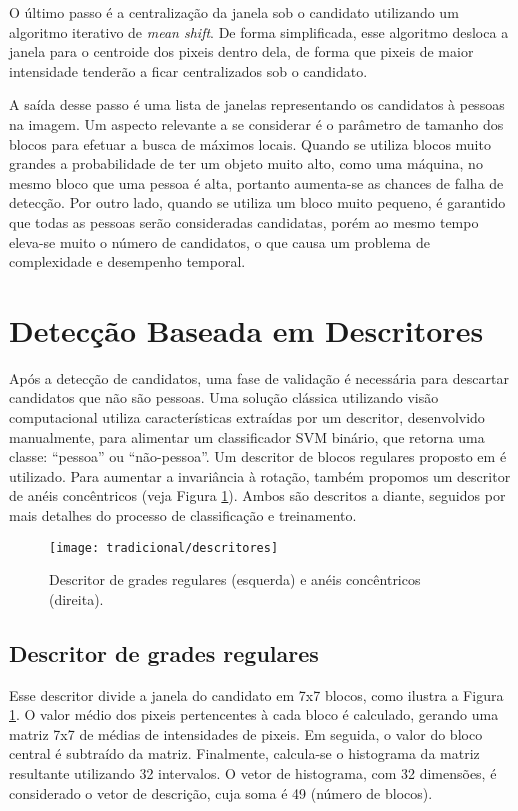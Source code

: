     O último passo é a centralização da janela sob o candidato utilizando um algoritmo iterativo de \textit{mean shift}. De forma simplificada, esse algoritmo desloca a janela para o centroide dos pixeis dentro dela, de forma que pixeis de maior intensidade tenderão a ficar centralizados sob o candidato.

    A saída desse passo é uma lista de janelas representando os candidatos à pessoas na imagem. Um aspecto relevante a se considerar é o parâmetro de tamanho dos blocos para efetuar a busca de máximos locais. Quando se utiliza blocos muito grandes a probabilidade de ter um objeto muito alto, como uma máquina, no mesmo bloco que uma pessoa é alta, portanto aumenta-se as chances de falha de detecção. Por outro lado, quando se utiliza um bloco muito pequeno, é garantido que todas as pessoas serão consideradas candidatas, porém ao mesmo tempo eleva-se muito o número de candidatos, o que causa um problema de complexidade e desempenho temporal.

\section{Detecção Baseada em Descritores}
\label{sec:classical}

    Após a detecção de candidatos, uma fase de validação é necessária para descartar candidatos que não são pessoas. Uma solução clássica utilizando visão computacional \cite{rauter} utiliza características extraídas por um descritor, desenvolvido manualmente, para alimentar um classificador SVM binário, que retorna uma classe: ``pessoa'' ou ``não-pessoa''. Um descritor de blocos regulares proposto em \cite{rauter} é utilizado. Para aumentar a invariância à rotação, também propomos um descritor de anéis concêntricos (veja Figura \ref{fig:descriptors}). Ambos são descritos a diante, seguidos por mais detalhes do processo de classificação e treinamento.

    \begin{figure}
    \centering
    \texttt{[image: tradicional/descritores]}
    \caption{Descritor de grades regulares (esquerda) e anéis concêntricos (direita).}
    \label{fig:descriptors}
    \end{figure}

    \subsection{Descritor de grades regulares}
      Esse descritor divide a janela do candidato em 7x7 blocos, como ilustra a Figura \ref{fig:descriptors}. O valor médio dos pixeis pertencentes à cada bloco é calculado, gerando uma matriz 7x7 de médias de intensidades de pixeis. Em seguida, o valor do bloco central é subtraído da matriz. Finalmente, calcula-se o histograma da matriz resultante utilizando 32 intervalos. O vetor de histograma, com 32 dimensões, é considerado o vetor de descrição, cuja soma é 49 (número de blocos).

